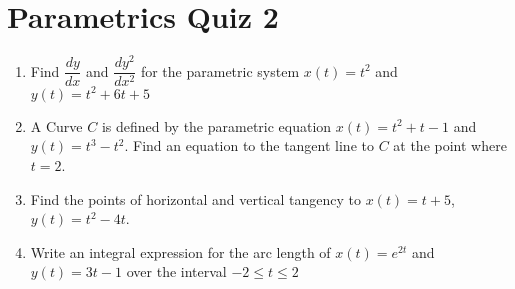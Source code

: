 \documentclass[
]{article}
\author{}
\date{}
\begin{document}
\hypertarget{parametrics-quiz-2}{%
\section{Parametrics Quiz 2}\label{parametrics-quiz-2}}

\begin{enumerate}
\def\labelenumi{\arabic{enumi}.}
\def\itemsep{2in}
\item
  Find \(\dfrac{dy}{dx}\) and \(\dfrac{dy^2}{dx^2}\) for the parametric
  system \(x(t)=t^2\) and \(y(t) = t^2+6t+5\)
\item
  A Curve \(C\) is defined by the parametric equation \(x(t) = t^2+t-1\)
  and \(y(t) = t^3-t^2\). Find an equation to the tangent line to \(C\)
  at the point where \(t=2\).
\item
  Find the points of horizontal and vertical tangency to \(x(t)=t+5\),
  \(y(t) = t^2-4t\).
\item
  Write an integral expression for the arc length of \(x(t) = e^{2t}\)
  and \(y(t) = 3t-1\) over the interval \(-2 \leq t \leq 2\)
\end{enumerate}
\end{document}
